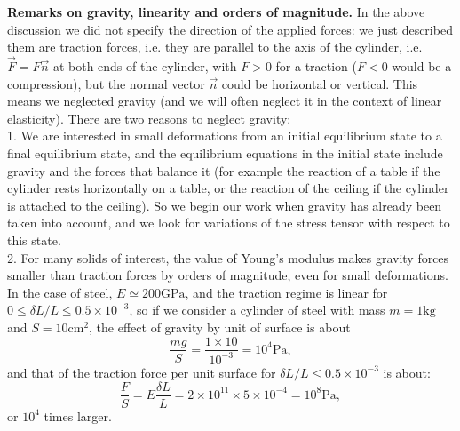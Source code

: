 \documentclass[DIV=12]{article}
\newcommand{\kg}{\mathrm{kg}}
\newcommand{\cm}{\mathrm{cm}}
\newcommand{\Pa}{\mathrm{Pa}}
\newcommand{\GPa}{\mathrm{GPa}}
\begin{document}
{\bf{Remarks on gravity, linearity and orders of magnitude.}} 
 In the above discussion we did not specify the direction of the applied forces: we 
 just described them are traction forces, i.e. they are parallel to the axis of the cylinder, i.e.
 $\vec{F} = F \vec{n}$ at both ends of the cylinder, with $F>0$ for a traction ($F<0$ would be
a compression), but the normal vector $\vec{n}$ could be horizontal or vertical. This means we neglected 
 gravity (and we will often neglect it in the context of linear elasticity). There 
 are two reasons to neglect gravity:\\
1. We are interested in small deformations from an initial equilibrium state to a final equilibrium state,
  and the equilibrium equations in the initial state include gravity and the forces that balance it (for example the reaction
 of a table if the cylinder rests horizontally on a table, or the reaction of the ceiling
 if the cylinder is attached to the ceiling). So we begin our work when gravity has already been taken into account, and
 we look for variations of the stress tensor with respect to this state.\\
2. For many solids of interest, the value of Young's modulus makes gravity forces 
 smaller than traction forces by orders of magnitude, even for small deformations. In the case of steel, $E\simeq 200 \GPa$, and the traction regime is linear for $0\leq \delta L / L \leq 0.5 \times 10^{-3}$, so if we consider a cylinder of steel
 with mass $m=1 \kg$ and $S=10 \cm^2$, the effect of gravity by unit of surface 
 is about 
\[
\frac{mg}{S} = \frac{1\times 10}{10^{-3}} = 10^4 \Pa,
\]
and that of the traction force per unit surface for $\delta L / L \leq 0.5 \times 10^{-3}$ is about:
\[
\frac{F}{S} = E \frac{\delta L}{L} = 2\times 10^{11} \times 5 \times 10^{-4} = 10^8 \Pa,
\]
or $10^4$ times larger.
\end{document}
